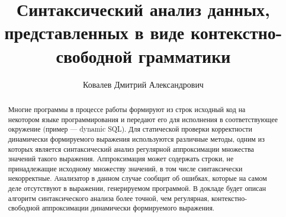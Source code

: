 



\theoremstyle{definition}
\newtheorem{defn}{Определение}
\theoremstyle{proposition}
\newtheorem{prop}{Предложение}

\title{Синтаксический анализ данных, представленных в виде контекстно-свободной грамматики}


\author{Ковалев Дмитрий Александрович}




\maketitle

\begin{abstract}
Многие программы в процессе работы формируют из строк исходный код на некотором языке программирования и передают его для исполнения в соответствующее окружение (пример --- dynamic SQL). Для статической проверки корректности динамически формируемого выражения используются различные методы, одним из которых является синтаксический анализ регулярной аппроксимации множества значений такого выражения. Аппроксимация может содержать строки, не принадлежащие исходному множеству значений, в том числе синтаксически некорректные. Анализатор в данном случае сообщит об ошибках, которые на самом деле отсутствуют в выражении, генерируемом программой. В докладе будет описан алгоритм синтаксического анализа более точной, чем регулярная, контекстно-свободной аппроксимации динамически формируемого выражения.
\end{abstract}









%
%

